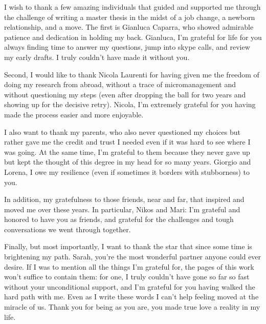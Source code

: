 
I wish to thank a few amazing individuals that guided and supported me through
the challenge of writing a master thesis in the midst of a job change, a
newborn relationship, and a move. The first is Gianluca Caparra, who showed
admirable patience and dedication in holding my back. Gianluca, I'm grateful for
life for you always finding time to answer my questions, jump into skype calls,
and review my early drafts. I truly couldn't have made it without you.

Second, I would like to thank Nicola Laurenti for having given me the freedom of
doing my research from abroad, without a trace of micromanagement and without
questioning my steps (even after dropping the ball for two years and showing up
for the decisive retry). Nicola, I'm extremely grateful for you having made the
process easier and more enjoyable.

I also want to thank my parents, who also never questioned my choices but rather
gave me the credit and trust I needed even if it was hard to see where I was
going. At the same time, I'm grateful to them because they never gave up but
kept the thought of this degree in my head for so many years. Giorgio and
Lorena, I owe my resilience (even if sometimes it borders with stubborness) to
you.

In addition, my gratefulness to those friends, near and far, that inspired and
moved me over these years. In particular, Nikos and Mari: I'm grateful and
honored to have you as friends, and grateful for the challenges and tough
conversations we went through together.

Finally, but most importantly, I want to thank the star that since some time is
brightening my path. Sarah, you're the most wonderful partner anyone could ever
desire. If I was to mention all the things I'm grateful for, the pages of this
work won't suffice to contain them: for one, I truly couldn't have gone so far
so fast without your unconditional support, and I'm grateful for you having
walked the hard path with me. Even as I write these words I can't help feeling
moved at the miracle of us. Thank you for being as you are, you made true love
a reality in my life.
